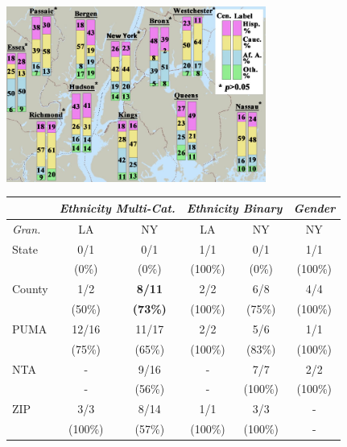 \begin{figure}[t]
  \centering
  \includegraphics[width=3.35in]{fig/footprints/map.jpg}
	\vspace{0.2ex}

{\small
\begin{tabular}{| l | c | c | c | c | c |}
\hline
 & \multicolumn{2}{c|}{\textit{Ethnicity Multi-Cat.}} & \multicolumn{2}{c|}{\textit{Ethnicity Binary}} & \textit{Gender}  \\ \hline
\textit{Gran.} & LA       & NY                & LA      & NY                              & NY \\ \hline
State          & 0/1      & 0/1               & 1/1     & 0/1                             & 1/1 \\
               & (0\%)    & (0\%)             & (100\%) & (0\%)                           & (100\%) \\ \hline
County         & 1/2      & \textbf{8/11}     & 2/2     & 6/8                             & 4/4 \\
               & (50\%)   & \textbf{(73\%)}   & (100\%) & (75\%)                          & (100\%) \\ \hline 
PUMA           & 12/16    & 11/17             & 2/2     & 5/6                             & 1/1\\ 
               & (75\%)   & (65\%)            & (100\%) & (83\%)                          & (100\%) \\ \hline
NTA            & -        & 9/16             & -       & 7/7                             & 2/2\\
               & -        & (56\%)            & -       & (100\%)                         & (100\%) \\ \hline
ZIP            & 3/3      & 8/14              & 1/1     & 3/3                             & -  \\
               & (100\%)  & (57\%)            & (100\%) & (100\%)                         & - \\ \hline

\end{tabular}}
\end{figure}
